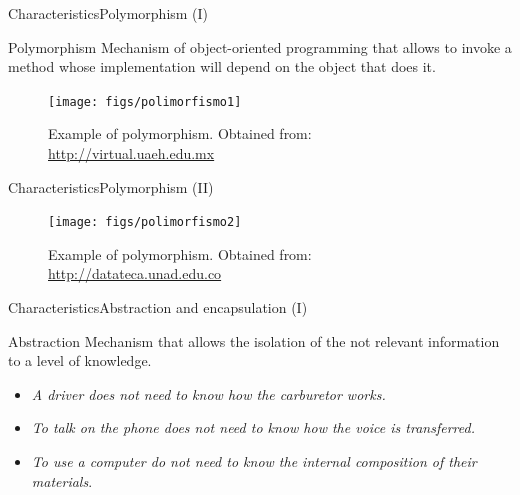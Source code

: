 \documentclass[10pt,compress]{beamer} %
\begin{document}
\begin{frame}{Characteristics}{Polymorphism (I)}
\vspace{-0.2cm}
	\begin{block}{Polymorphism}
		Mechanism of object-oriented programming that allows to invoke a method whose implementation will depend on the object that does it.
  	\end{block}	
	\begin{figure}
	  \vspace{-0.2cm}
		\texttt{[image: figs/polimorfismo1]}
		\vspace{-0.2cm}
		\caption{\scriptsize{Example of polymorphism. Obtained from: \url{http://virtual.uaeh.edu.mx}}}
	\end{figure}
\end{frame}

\begin{frame}{Characteristics}{Polymorphism (II)}
	\begin{figure}
		\texttt{[image: figs/polimorfismo2]}
		\vspace{-0.1cm}
		\caption{{\scriptsize Example of polymorphism. Obtained from: \url{http://datateca.unad.edu.co}}}
	\end{figure}
\end{frame}


\begin{frame}{Characteristics}{Abstraction and encapsulation (I)}
	\begin{block}{Abstraction}
		Mechanism that allows the isolation of the not relevant information to a level of knowledge.
  	\end{block}	
	
	\begin{itemize}
		\item \textit{A driver does not need to know how the carburetor works.} 
		\item \textit{To talk on the phone does not need to know how the voice is transferred.} 
		\item \textit{To use a computer do not need to know the internal composition of their materials}. 							  
		
	\end{itemize}
\end{frame}
\end{document}
